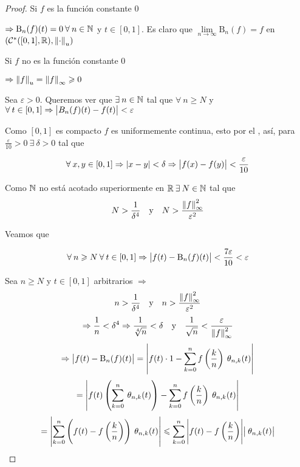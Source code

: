 \begin{proof}
    Si $f$ es la función constante 0

    $\Rightarrow \mathrm{B}_n(f)(t) = 0 \: \forall \: n \in \mathbb{N}$ y $t \in [0,1]$. Es claro que $\lim\limits_{n \to \infty}\mathrm{B}_n(f) = f $ en $({\mathcal{C}}^{\ast}([0,1],\mathbb{R}), {\norm{\cdot}}_{u})$

    Si $f$ no es la función constante 0

    $\Rightarrow {\norm{f}}_{u} = {\norm{f}}_{\infty} \geqslant 0$

    Sea $\varepsilon > 0$. Queremos ver que $\exists \: n \in \mathbb{N}$ tal que $\forall \: n \geqslant N$ y $\forall \: t \in [0,1] \Rightarrow \abs{{B}_n(f)(t)-f(t)} < \varepsilon$

    Como $[0,1]$ es compacto $f$ es uniformemente continua, esto por el , así, para $\frac{\varepsilon}{10} > 0 \: \exists \: \delta > 0$ tal que

    $$\forall \: x, y \in [0,1] \Rightarrow \abs{x-y} < \delta \Rightarrow \abs{f(x)-f(y)} < \frac{\varepsilon}{10}$$

    Como $\mathbb{N}$ no está acotado superiormente en $\mathbb{R} \:\exists \: N \in \mathbb{N}$ tal que
    \begin{align*}
        N > \frac{1}{\delta^4} && \text{y} && N > \frac{{\norm{f}}^{2}_{\infty}}{\varepsilon^2}
    \end{align*}

    Veamos que

    $$\forall \: n \geqslant N \: \forall \: t \in [0,1] \Rightarrow \abs{f(t)-\mathrm{B}_n(f)(t)} < \frac{7\varepsilon}{10} < \varepsilon$$

    Sea $n \geqslant N$ y $t \in [0,1]$ arbitrarios $\Rightarrow$
    \begin{align*}
        n > \frac{1}{\delta^4} && \text{y} && n > \frac{{\norm{f}}^{2}_{\infty}}{\varepsilon^2}
    \end{align*}
    \begin{align*}
      \Rightarrow  \frac{1}{n} < \delta^4 \Rightarrow \frac{1}{\sqrt[4]{n}} < \delta && \text{y} && \frac{1}{\sqrt{n}} < \frac{\varepsilon}{{\norm{f}}^{2}_{\infty}}
    \end{align*}
    $$\Rightarrow  \abs{f(t)-\mathrm{B}_n(f)(t)} = \abs{f(t) \cdot 1 -  \sum\limits_{k=0}^{n} f\left( \frac{k}{n} \right) \: {\theta}_{n,k} (t)}$$
    $$= \abs{f(t) \left( \sum\limits_{k=0}^{n}  \: {\theta}_{n,k} (t)\right) - \sum\limits_{k=0}^{n} f\left( \frac{k}{n} \right) \: {\theta}_{n,k} (t)}$$
    $$= \abs{\sum\limits_{k=0}^{n} \left( f(t)-f \left( \frac{k}{n} \right) \right)  \: {\theta}_{n,k} (t)} \leqslant \sum\limits_{k=0}^{n} \abs{f(t)-f \left( \frac{k}{n} \right) } \abs{\: {\theta}_{n,k} (t)}$$


\end{proof}

